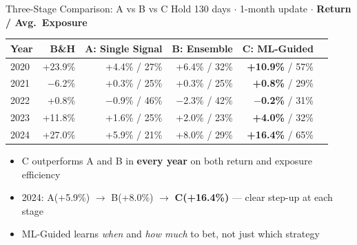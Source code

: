 \documentclass[aspectratio=169]{beamer}
\begin{document}
\begin{frame}{Three-Stage Comparison: A vs B vs C}
  \small
  Hold 130 days $\cdot$ 1-month update $\cdot$ \textbf{Return / Avg.\ Exposure}

  \vspace{0.4em}
  \begin{tabular}{lrrrrr}
    \toprule
    Year & B\&H & A: Single Signal & B: Ensemble & C: ML-Guided \\
    \midrule
    2020 & +23.9\% & +4.4\% / 27\% & +6.4\% / 32\% & \textbf{+10.9\%} / 57\% \\
    2021 & $-$6.2\%  & +0.3\% / 25\% & +0.3\% / 25\% & \textbf{+0.8\%} / 29\% \\
    2022 & +0.8\%  & $-$0.9\% / 46\% & $-$2.3\% / 42\% & \textbf{$-$0.2\%} / 31\% \\
    2023 & +11.8\% & +1.6\% / 25\% & +2.0\% / 23\% & \textbf{+4.0\%} / 32\% \\
    2024 & +27.0\% & +5.9\% / 21\% & +8.0\% / 29\% & \textbf{+16.4\%} / 65\% \\
    \bottomrule
  \end{tabular}

  \vspace{0.5em}
  \begin{itemize}
    \item C outperforms A and B in \textbf{every year} on both return and exposure efficiency
    \item 2024: A(+5.9\%) $\to$ B(+8.0\%) $\to$ \textbf{C(+16.4\%)} — clear step-up at each stage
    \item ML-Guided learns \emph{when} and \emph{how much} to bet, not just which strategy
  \end{itemize}
\end{frame}
\end{document}
